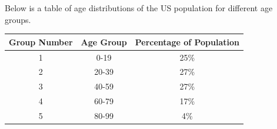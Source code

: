 \documentclass[10pt]{article}
\begin{document}
 Below is a table of age distributions of the US population for different age groups. 

    \begin{table}[h!]
        \centering
        \begin{tabular}{c|c|c}
            \hline
           Group Number & Age Group & Percentage of Population \\
           \hline
            1 & 0-19 & 25\% \\
            2 & 20-39 & 27\% \\
            3 & 40-59 & 27\% \\
            4 & 60-79 & 17\%\\
            5 & 80-99 & 4\%\\
           \hline
        \end{tabular}
    \end{table}
\end{document}
